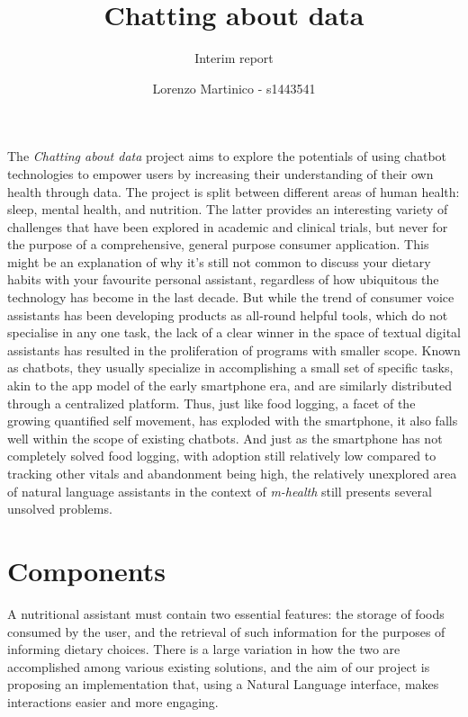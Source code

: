 \documentclass{scrartcl}
\begin{document}
\title{Chatting about data}
\subtitle{Interim report}
\author{Lorenzo Martinico - s1443541}
\maketitle
The \textit{Chatting about data} project aims to explore the potentials of using chatbot technologies to empower users by increasing their understanding of their own health through data. The project is split between different areas of human health: sleep, mental health, and nutrition. The latter provides an interesting variety of challenges that have been explored in academic and clinical trials, but never for the purpose of a comprehensive, general purpose consumer application. This might be an explanation of why it’s still not common to discuss your dietary habits with your favourite personal assistant, regardless of how ubiquitous the technology has become in the last decade. But while the trend of consumer voice assistants has been developing products as all-round helpful tools, which do not specialise in any one task, the lack of a clear winner in the space of textual digital assistants has resulted in the proliferation of programs with smaller scope. Known as chatbots, they usually specialize in accomplishing a small set of specific tasks, akin to the app model of the early smartphone era, and are similarly distributed through a centralized platform. Thus, just like food logging, a facet of the growing quantified self movement, has exploded with the smartphone, it also falls well within the scope of existing chatbots. And just as the smartphone has not completely solved food logging, with adoption still relatively low compared to tracking other vitals and abandonment being high, the relatively unexplored area of natural language assistants in the context of \textit{m-health} still presents several unsolved problems.
\section*{Components}
A nutritional assistant must contain two essential features: the storage of foods consumed by the user, and the retrieval of such information for the purposes of informing dietary choices. There is a large variation in how the two are accomplished among various existing solutions, and the aim of our project is proposing an implementation that, using a Natural Language interface, makes interactions easier and more engaging. \\
\end{document}
